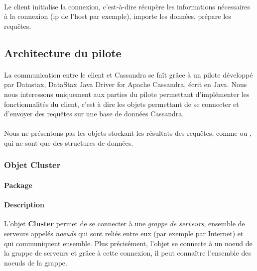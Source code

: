\documentclass[12pt]{article}
\begin{document}
\paragraph{} Le client initialise la connexion, c'est-à-dire récupère les informations nécessaires à la connexion (ip de l'host par exemple), importe les données, prépare les requêtes.


\subsection{Architecture du pilote}

\paragraph{} La communication entre le client et Cassandra se faît grâce à un pilote développé par Datastax, DataStax Java Driver for Apache Cassandra, écrit en Java.
Nous nous interessons uniquement aux parties du pilote permettant d'implémenter les fonctionnalités du client, c'est à dire les objets permettant de se connecter et d'envoyer des requêtes sur une base de données Cassandra.

\paragraph{} Nous ne présentons pas les objets stockant les résultats des requêtes, comme  ou , qui ne sont que des structures de données. 

\subsubsection{Objet Cluster}

\paragraph{Package}  

\paragraph{Description} L'objet \textbf{Cluster} permet de se connecter à une \textit{grappe de serveurs}, ensemble de serveurs appelés \textit{noeuds} qui sont reliés entre eux (par exemple par Internet) et qui communiquent ensemble.
Plus précisément, l'objet se connecte à un noeud de la grappe de serveurs et grâce à cette connexion, il peut connaître l'ensemble des noeuds de la grappe.
\end{document}
